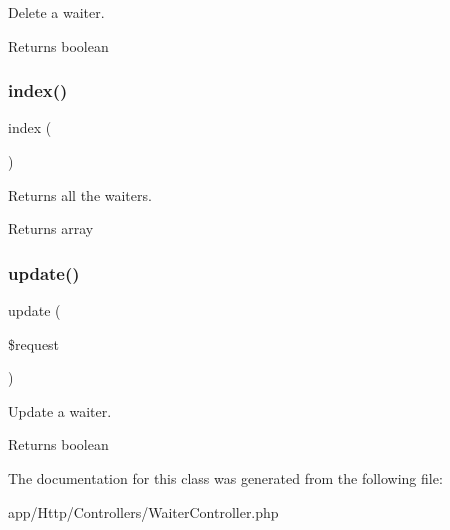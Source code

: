 Delete a waiter.

\begin{DoxyReturn}{Returns}
boolean 
\end{DoxyReturn}
\mbox{\label{class_app_1_1_http_1_1_controllers_1_1_waiter_controller_a149eb92716c1084a935e04a8d95f7347}} 
\subsubsection{\texorpdfstring{index()}{index()}}
{\footnotesize\ttfamily index (\begin{DoxyParamCaption}{ }\end{DoxyParamCaption})}

Returns all the waiters.

\begin{DoxyReturn}{Returns}
array 
\end{DoxyReturn}
\mbox{\label{class_app_1_1_http_1_1_controllers_1_1_waiter_controller_ab7b27a90191560dcef32126b0945db0d}} 
\subsubsection{\texorpdfstring{update()}{update()}}
{\footnotesize\ttfamily update (\begin{DoxyParamCaption}\item[{}]{\$request }\end{DoxyParamCaption})}

Update a waiter.

\begin{DoxyReturn}{Returns}
boolean 
\end{DoxyReturn}


The documentation for this class was generated from the following file\+:\begin{DoxyCompactItemize}
\item 
app/\+Http/\+Controllers/Waiter\+Controller.\+php\end{DoxyCompactItemize}
